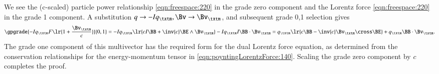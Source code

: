 We see the (c-scaled) particle power relationship
\cref{eqn:freespace:220}
in the grade zero component and the Lorentz force \cref{eqn:freespace:220} in the grade 1 component.
A substitution \( q \rightarrow -I q_\txtm, \Bv \rightarrow \Bv_\txtm \), and subsequent grade 0,1 selection gives
\begin{dmath}\label{eqn:lorentzForce:320}
\gpgrade{
-I q_\txtm F \lr{ 1 + \frac{\Bv_\txtm}{c} }
}{0,1}
=
- I q_\txtm \lr{ c I \BB + \inv{c} \BE \wedge \Bv_\txtm }
- I q_\txtm I \BB \cdot \Bv_\txtm
=
q_\txtm \lr{ c \BB - \inv{c} \Bv_\txtm \cross \BE }
+
q_\txtm \BB \cdot \Bv_\txtm.
\end{dmath}
The grade one component of this multivector has the
required form for the dual Lorentz force equation, as determined from the conservation relationships for the energy-momentum tensor in
\cref{eqn:poyntingLorentzForce:140}.
Scaling the grade zero component by \( c \) completes the proof.


